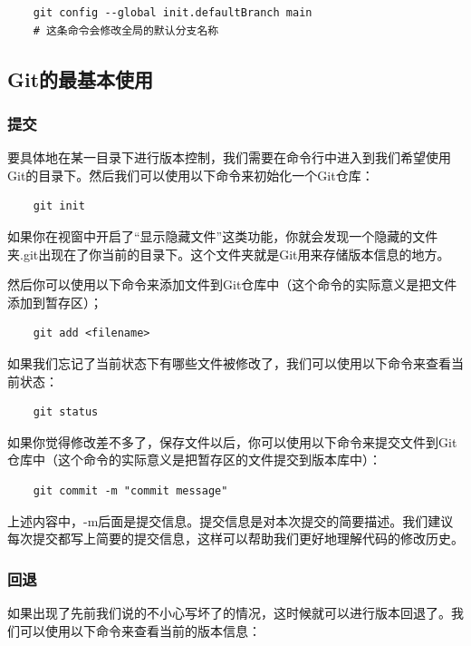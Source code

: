 \documentclass[fontset=none]{ctexart}
\begin{document}
\begin{verbatim}
    git config --global init.defaultBranch main
    # 这条命令会修改全局的默认分支名称
\end{verbatim}

\subsection{Git的最基本使用}

\subsubsection{提交}

要具体地在某一目录下进行版本控制，我们需要在命令行中进入到我们希望使用Git的目录下。然后我们可以使用以下命令来初始化一个Git仓库：

\begin{verbatim}
    git init
\end{verbatim}

如果你在视窗中开启了“显示隐藏文件”这类功能，你就会发现一个隐藏的文件夹.git出现在了你当前的目录下。这个文件夹就是Git用来存储版本信息的地方。

然后你可以使用以下命令来添加文件到Git仓库中（这个命令的实际意义是把文件添加到暂存区）；

\begin{verbatim}
    git add <filename>
\end{verbatim}

如果我们忘记了当前状态下有哪些文件被修改了，我们可以使用以下命令来查看当前状态：
\begin{verbatim}
    git status
\end{verbatim}

如果你觉得修改差不多了，保存文件以后，你可以使用以下命令来提交文件到Git仓库中（这个命令的实际意义是把暂存区的文件提交到版本库中）：

\begin{verbatim}
    git commit -m "commit message"
\end{verbatim}

上述内容中，-m后面是提交信息。提交信息是对本次提交的简要描述。我们建议每次提交都写上简要的提交信息，这样可以帮助我们更好地理解代码的修改历史。

\subsubsection{回退}

如果出现了先前我们说的不小心写坏了的情况，这时候就可以进行版本回退了。我们可以使用以下命令来查看当前的版本信息：
\end{document}
